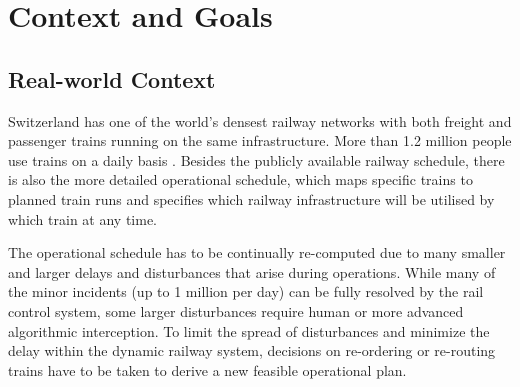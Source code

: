 \documentclass{article}
\begin{document}
\section{Context and Goals}

\subsection{Real-world Context}
Switzerland has one of the world's densest railway networks with both freight and passenger trains running on the same infrastructure. More than 1.2 million people use trains on a daily basis \cite{rcsbrochure}.
Besides the publicly available railway schedule, there is also the more detailed operational schedule, which maps specific trains to planned train runs and specifies which railway infrastructure will be utilised by which train at any time.

The operational schedule has to be continually re-computed due to many smaller and larger delays and disturbances that arise during operations. While many of the minor incidents (up to 1 million per day) can be fully resolved by the rail control system, some larger disturbances require human or more advanced algorithmic interception. To limit the spread of disturbances and minimize the delay within the dynamic railway system, decisions on re-ordering or re-routing trains have to be taken to derive a new feasible operational plan.
\end{document}
